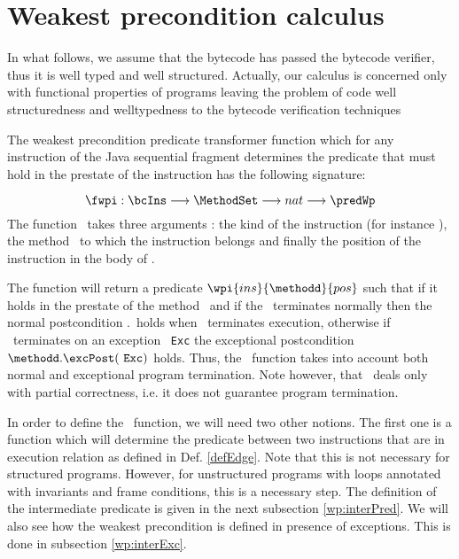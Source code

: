  






\section{Weakest precondition calculus} \label{wpRules}

In what follows, we assume that the bytecode has passed the bytecode verifier, thus it is well typed and well structured. Actually, our calculus is concerned only
with functional properties of programs leaving the problem of code well structuredness and welltypedness to the bytecode verification techniques 








The weakest precondition predicate transformer function which for any instruction of the Java sequential fragment
determines the predicate that must hold in the prestate of the instruction has the following signature:

$$ \fwpi :  \bcIns \longrightarrow \MethodSet   \longrightarrow  nat \longrightarrow \predWp $$
The function \fwpi \ takes three arguments : 
 the kind of the instruction (for instance  \putfield),
the method \methodd \ to which the  instruction belongs
and finally the position of the instruction in the body of  \methodd.

The function will return a predicate $\wpi{ins}{\methodd}{pos}$ such that  if it holds in the prestate of the method \methodd \  and if the
\methodd \ terminates normally then the normal postcondition \methodd.\normalPost \ holds when  \methodd \ terminates execution, otherwise if \methodd \ terminates on an exception
  \mbox{ \rm \texttt{Exc}} the exceptional postcondition  $ \methodd.\excPost( \mbox{ \rm \texttt{Exc}} )$ holds. 
Thus, the \fwpi \ function takes into account both normal and exceptional program termination. Note however, that \fwpi \ deals only with partial correctness, i.e.
 it does not guarantee program termination.

In order to define the \fwpi \ function, we will need two other notions.
 The first one is a function which will determine the predicate between two instructions that are in execution relation as defined in Def. \ref{defEdge}. 
Note that this is not necessary for structured programs. However, for unstructured programs with loops annotated with invariants and frame conditions,
this is a necessary step.  The definition of the intermediate predicate is given in the next subsection \ref{wp:interPred}.
We will also see how the weakest precondition is defined in presence of exceptions. This is done in subsection \ref{wp:interExc}.

 





